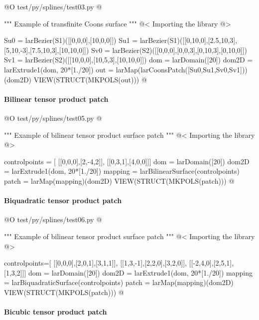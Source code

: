 \documentclass[11pt,oneside]{article}	%
\begin{document}
@O test/py/splines/test03.py  
@{""" Example of transfinite Coons surface """
@< Importing the library @>

Su0 = larBezier(S1)([[0,0,0],[10,0,0]])
Su1 = larBezier(S1)([[0,10,0],[2.5,10,3],[5,10,-3],[7.5,10,3],[10,10,0]])
Sv0 = larBezier(S2)([[0,0,0],[0,0,3],[0,10,3],[0,10,0]])
Sv1 = larBezier(S2)([[10,0,0],[10,5,3],[10,10,0]])
dom = larDomain([20])
dom2D = larExtrude1(dom, 20*[1./20])
out = larMap(larCoonsPatch([Su0,Su1,Sv0,Sv1]))(dom2D)
VIEW(STRUCT(MKPOLS(out)))
@}


\paragraph{Bilinear tensor product patch}


@O test/py/splines/test05.py
@{""" Example of bilinear tensor product surface patch """
@< Importing the library @>

controlpoints = [
	[[0,0,0],[2,-4,2]],
	[[0,3,1],[4,0,0]]]
dom = larDomain([20])
dom2D = larExtrude1(dom, 20*[1./20])
mapping = larBilinearSurface(controlpoints)
patch = larMap(mapping)(dom2D)
VIEW(STRUCT(MKPOLS(patch)))
@}

\paragraph{Biquadratic tensor product patch}

@O test/py/splines/test06.py
@{""" Example of bilinear tensor product surface patch """
@< Importing the library @>

controlpoints=[
	[[0,0,0],[2,0,1],[3,1,1]],
	[[1,3,-1],[2,2,0],[3,2,0]],
	[[-2,4,0],[2,5,1],[1,3,2]]]
dom = larDomain([20])
dom2D = larExtrude1(dom, 20*[1./20])
mapping = larBiquadraticSurface(controlpoints)
patch = larMap(mapping)(dom2D)
VIEW(STRUCT(MKPOLS(patch)))
@}


\paragraph{Bicubic tensor product patch}
\end{document}
